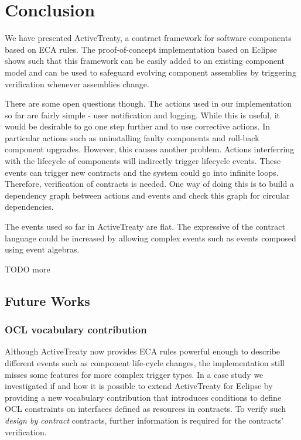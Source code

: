 \documentclass{llncs}
\begin{document}
\section{Conclusion}
\label{section:conclusion}

We have presented ActiveTreaty, a contract framework for software components based on ECA rules. The proof-of-concept implementation based on Eclipse shows such that this framework can be easily added to an existing component model and can be used to safeguard evolving component assemblies by triggering verification whenever assemblies change. 

There are some open questions though. The actions used in our implementation so far are fairly simple - user notification and logging. While this is useful, it would be desirable to go one step further and to use corrective actions.  In particular actions such as uninstalling faulty components and roll-back component upgrades. However, this causes another problem. Actions interferring with the lifecycle of components will indirectly trigger lifecycle events. These events can trigger new contracts and the system could go into infinite loops. Therefore, verification of contracts is needed. One way of doing this is to build a dependency graph between actions and events and check this graph for circular dependencies. 

The events used so far in ActiveTreaty are flat. The expressive of the contract language could be increased by allowing complex events such as events composed using event algebras. 

TODO more


\subsection{Future Works}

\subsubsection{OCL vocabulary contribution}

Although ActiveTreaty now provides ECA rules powerful enough to describe different events such as component life-cycle changes, the implementation still misses some features for more complex trigger types. In a case study \cite{DAWilke} we investigated if and how it is possible to extend ActiveTreaty for Eclipse by providing a new vocabulary contribution that introduces conditions to define OCL constraints \cite{OCL20} on interfaces defined as resources in contracts. To verify such \textit{design by contract} \cite{DesignByContract,meyerOOSC} contracts, further information is required for the contracts' verification.
\end{document}
